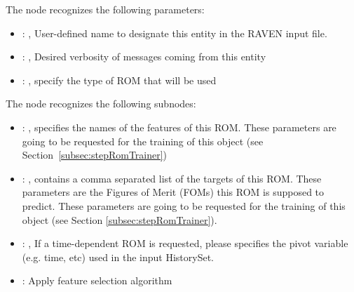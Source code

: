   The  node recognizes the following parameters:
    \begin{itemize}
      \item {}: , 
        User-defined name to designate this entity in the RAVEN input file.
      \item {}: , 
        Desired verbosity of messages coming from this entity
      \item {}: , 
        specify the type of ROM that will be used
  \end{itemize}

  The  node recognizes the following subnodes:
  \begin{itemize}
    \item {}: , 
      specifies the names of the features of this ROM.         \nb These parameters are going to be
      requested for the training of this object         (see Section~\ref{subsec:stepRomTrainer})

    \item {}: , 
      contains a comma separated list of the targets of this ROM. These parameters         are the
      Figures of Merit (FOMs) this ROM is supposed to predict.         \nb These parameters are
      going to be requested for the training of this         object (see Section
      \ref{subsec:stepRomTrainer}).

    \item {}: , 
      If a time-dependent ROM is requested, please specifies the pivot         variable (e.g. time,
      etc) used in the input HistorySet.

    \item {}:
      Apply feature selection algorithm


\end{itemize}
